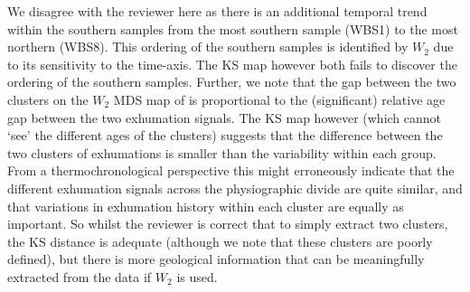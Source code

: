 \documentclass{article}[12p,a4paper]
\begin{document}
We disagree with the reviewer here as there is an additional temporal trend within the southern samples from the most southern sample (WBS1) to the most northern (WBS8). This ordering of the southern samples is identified by $W_2$ due to its sensitivity to the time-axis. The KS map however both fails to discover the ordering of the southern samples. Further, we note that the gap between the two clusters on the $W_2$ MDS map of is proportional to the (significant) relative age gap between the two exhumation signals. The KS map however (which cannot `see' the different ages of the clusters) suggests that the difference between the two clusters of exhumations is smaller than the variability within each group. From a thermochronological perspective this might erroneously indicate that the different exhumation signals across the physiographic divide are quite similar, and that variations in exhumation history within each cluster are equally as important. So whilst the reviewer is correct that to simply extract two clusters, the KS distance is adequate (although we note that these clusters are poorly defined), but there is more geological information that can be meaningfully extracted from the data if $W_2$ is used.\\


\begin{refcontext}[sorting=nyt]
\printbibliography
\end{refcontext}
\end{document}
